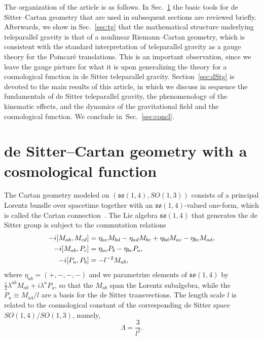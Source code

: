 \documentclass[%
5p,
times,
sort&compress
]{elsarticle}
\def\mf{\mathfrak}
\begin{document}
The organization of the article is as follows. In 
Sec.~\ref{sec:dSCgeo} the basic tools for de Sitter--Cartan 
geometry that are used in subsequent sections are reviewed 
briefly. Afterwards, we show in Sec.~\ref{sec:tg} that the 
mathematical structure underlying teleparallel gravity is that of 
a nonlinear Riemann--Cartan geometry, which is consistent with 
the standard interpretation of teleparallel gravity as a gauge 
theory for the Poincar\'e translations. This is an important 
observation, since we leave the gauge picture for what it is upon 
generalizing the theory for a cosmological function in de Sitter 
teleparallel gravity. Section~\ref{sec:dStg} is devoted to the 
main results of this article, in which we discuss in sequence the 
fundamentals of de Sitter teleparallel gravity, the phenomenology 
of the kinematic effects, and the dynamics of the gravitational 
field and the cosmological function. We conclude 
in~Sec.~\ref{sec:concl}.

\section{de Sitter--Cartan geometry with a cosmological function}
\label{sec:dSCgeo}

The Cartan geometry modeled on $(\mf{so}(1,4),SO(1,3))$ 
consists of a principal Lorentz bundle over spacetime together 
with an $\mf{so}(1,4)$-valued one-form, which is called the 
Cartan connection~\cite{Alekseevsky:1995cc, sharpe1997diff_geo, 
  Wise:2009fu, Wise:2010sm}. The Lie algebra $\mf{so}(1,4)$ that 
generates the de Sitter group is subject to the commutation 
relations
\begin{align}
  -i[M_{ab},M_{cd}] &= \eta_{ac}M_{bd} - \eta_{ad}M_{bc} 
  + \eta_{bd}M_{ac} - \eta_{bc}M_{ad},
  \notag\\
  -i[M_{ab},P_c] &= \eta_{ac}P_b- \eta_{bc}P_a,
  \notag\\
  -i[P_a,P_b] &= -l^{-2}M_{ab},
  \label{eq:comm_relations_so(1,4)}
\end{align}
where $\eta_{ab} = (+, - , -, -)$ and we parametrize elements of 
$\mf{so}(1,4)$ by $\tfrac{i}{2} \lambda^{ab} M_{ab} + i \lambda^a 
P_a$, so that the $M_{ab}$ span the Lorentz subalgebra, while the 
$P_a \equiv M_{a4}/l$ are a basis for the de Sitter 
transvections. The length scale $l$ is related to the 
cosmological constant of the corresponding de Sitter space 
$SO(1,4)/SO(1,3)$, namely,~\cite{Wise:2010sm}
\begin{equation}
  \label{eq:rel.Ll}
  \Lambda = \frac{3}{l^2}.
\end{equation}
\end{document}

